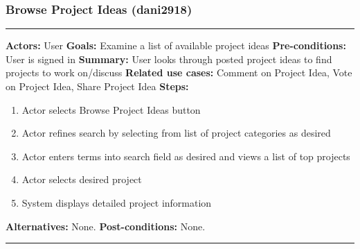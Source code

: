 \documentclass[11pt]{report}
\begin{document}
\subsubsection{Browse Project Ideas (dani2918)}
\vspace{2pt}
\hrule
\vspace{8pt}
 \textbf{Actors:} User \newline
\textbf{Goals:} Examine a list of available project ideas  \newline
 \textbf{Pre-conditions:} User is signed in  \newline
 \textbf{Summary:} User looks through posted project ideas to find projects to work on/discuss \newline
\textbf{Related use cases:} Comment on Project Idea, Vote on Project Idea, Share Project Idea \newline
\textbf{Steps:} \begin{enumerate}
  \item Actor selects Browse Project Ideas button
  \item Actor refines search by selecting from list of project categories as desired
  \item Actor enters terms into search field as desired and views a list of top projects
  \item Actor selects desired project
  \item System displays detailed project information
 \end{enumerate}
 \textbf{Alternatives:} None. \newline
 \textbf{Post-conditions:} None. \newline
\vspace{8pt}
\hrule
\newpage
\end{document}
